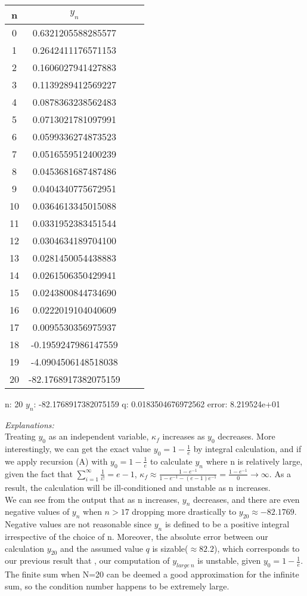 \documentclass[12pt]{article}
\begin{document}
\begin{center}
 \begin{tabular}{|c| c| c| c||} 
 \hline
 n & $y_n$ \\ 
 \hline\hline
0 & 0.6321205588285577 \\
\hline
1 & 0.2642411176571153 \\
\hline
2 & 0.1606027941427883 \\
\hline
3 & 0.1139289412569227 \\
\hline
4 & 0.0878363238562483 \\
\hline
5 & 0.0713021781097991 \\
\hline
6 & 0.0599336274873523 \\
\hline
7 & 0.0516559512400239 \\
\hline
8 & 0.0453681687487486 \\
\hline
9 & 0.0404340775672951 \\
\hline
10 & 0.0364613345015088 \\
\hline
11 & 0.0331952383451544 \\
\hline
12 & 0.0304634189704100 \\
\hline
13 & 0.0281450054438883 \\
\hline
14 & 0.0261506350429941 \\
\hline
15 & 0.0243800844734690 \\
\hline
16 & 0.0222019104040609 \\
\hline
17 & 0.0095530356975937 \\
\hline
18 & -0.1959247986147559 \\
\hline
19 & -4.0904506148518038 \\
\hline
20 & -82.1768917382075159 \\
\hline
\end{tabular}
\label{tab:title} \end{center}

n: 20 $y_n$: -82.1768917382075159 q: 0.0183504676972562 error: 8.219524e+01

\emph{Explanations:}\\
Treating $y_0$ as an independent variable, $\kappa_f$ increases as $y_0$ decreases. More interestingly, we can get the exact value $y_0 = 1-\frac{1}{e}$ by integral calculation, and if we apply recursion (A) with $y_0 = 1-\frac{1}{e}$ to calculate $y_n$ where n is relatively large, given the fact that $\sum_{i = 1}^{\infty} \frac{1}{i!} = e - 1$, $\kappa_f \approx \frac{1-e^{-1}}{1-e^{-1}-(e-1)e^{-1}} = \frac{1-e^{-1}}{0} \to \infty$. As a result, the calculation will be ill-conditioned and unstable as n increases.\\
We can see from the output that as n increases, $y_n$ decreases, and there are even negative values of $y_n$ when $n>17$ dropping more drastically to $y_20 \approx -82.1769$. Negative values are not reasonable since $y_n$ is defined to be a positive integral irrespective of the choice of n. Moreover, the absolute error between our calculation $y_{20}$ and the assumed value $q$ is sizable($\approx 82.2$), which corresponds to our previous result that , our computation of $y_{large\ n}$ is unstable, given $y_0 = 1-\frac{1}{e}$. The finite sum when N=20 can be deemed a good approximation for the infinite sum, so the condition number happens to be extremely large.
\end{document}
